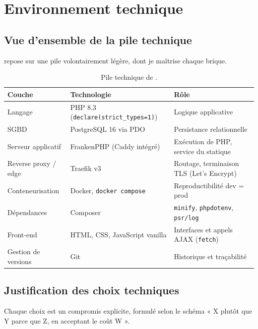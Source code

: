 \chapter{Environnement technique}
\label{ch:environnement}

\section{Vue d'ensemble de la pile technique}

\projet{} repose sur une pile volontairement légère, dont je maîtrise chaque brique.

\begin{table}[ht]
\centering
\renewcommand{\arraystretch}{1.3}
\small
\begin{tabularx}{\textwidth}{@{}L{3.4cm} L{4.2cm} X@{}}
\toprule
\textbf{Couche} & \textbf{Technologie} & \textbf{Rôle} \\
\midrule
Langage & PHP 8.3 (\texttt{declare(strict\_types=1)}) & Logique applicative \\
SGBD & PostgreSQL 16 via PDO & Persistance relationnelle \\
Serveur applicatif & FrankenPHP (Caddy intégré) & Exécution de PHP, service du statique \\
Reverse proxy / edge & Traefik v3 & Routage, terminaison TLS (Let's Encrypt) \\
Conteneurisation & Docker, \texttt{docker compose} & Reproductibilité dev = prod \\
Dépendances & Composer & \texttt{minify}, \texttt{phpdotenv}, \texttt{psr/log} \\
Front-end & HTML, CSS, JavaScript vanilla & Interfaces et appels AJAX (\texttt{fetch}) \\
Gestion de versions & Git & Historique et traçabilité \\
\bottomrule
\end{tabularx}
\caption{Pile technique de \projet{}.}
\label{tab:stack}
\end{table}

\section{Justification des choix techniques}

Chaque choix est un compromis explicite, formulé selon le schéma « X plutôt que Y parce que Z,
en acceptant le coût W ».

